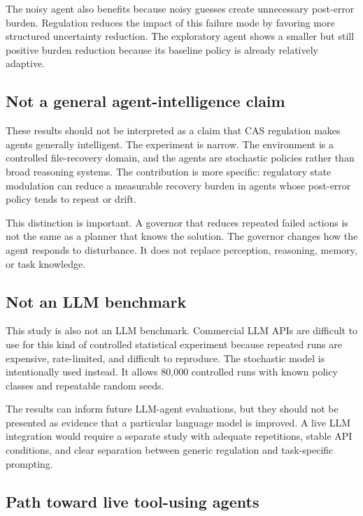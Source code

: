 \documentclass[11pt]{article}
\begin{document}
The noisy agent also benefits because noisy guesses create unnecessary post-error burden. Regulation reduces the impact of this failure mode by favoring more structured uncertainty reduction. The exploratory agent shows a smaller but still positive burden reduction because its baseline policy is already relatively adaptive.

\subsection{Not a general agent-intelligence claim}

These results should not be interpreted as a claim that CAS regulation makes agents generally intelligent. The experiment is narrow. The environment is a controlled file-recovery domain, and the agents are stochastic policies rather than broad reasoning systems. The contribution is more specific: regulatory state modulation can reduce a measurable recovery burden in agents whose post-error policy tends to repeat or drift.

This distinction is important. A governor that reduces repeated failed actions is not the same as a planner that knows the solution. The governor changes how the agent responds to disturbance. It does not replace perception, reasoning, memory, or task knowledge.

\subsection{Not an LLM benchmark}

This study is also not an LLM benchmark. Commercial LLM APIs are difficult to use for this kind of controlled statistical experiment because repeated runs are expensive, rate-limited, and difficult to reproduce. The stochastic model is intentionally used instead. It allows 80,000 controlled runs with known policy classes and repeatable random seeds.

The results can inform future LLM-agent evaluations, but they should not be presented as evidence that a particular language model is improved. A live LLM integration would require a separate study with adequate repetitions, stable API conditions, and clear separation between generic regulation and task-specific prompting.

\subsection{Path toward live tool-using agents}
\end{document}
